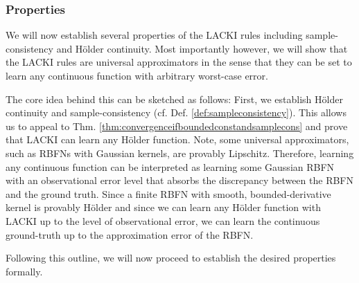 \subsubsection{Properties}
We will now establish several properties of the LACKI rules including sample-consistency and H\"older continuity. Most importantly however, we will show that the LACKI rules are universal approximators in the sense that they can be set to learn any continuous function with arbitrary worst-case error.

The core idea behind this can be sketched as follows: 
First, we establish H\"older continuity and sample-consistency (cf. Def. \ref{def:sampleconsistency}). This allows us to appeal to Thm. \ref{thm:convergenceifboundedconstandsamplecons} and prove that LACKI can learn any H\"older function.
Note, some universal approximators, such as RBFNs with Gaussian kernels, are provably Lipschitz. Therefore, learning any continuous function can be interpreted as learning some Gaussian RBFN with an observational error level that absorbs the discrepancy between the RBFN and the ground truth. Since a finite RBFN with smooth, bounded-derivative kernel is provably H\"older and since we can learn any H\"older function with LACKI up to the level of observational error, we can learn the continuous ground-truth up to the approximation error of the RBFN. 

Following this outline, we will now proceed to establish the desired properties formally.
 
